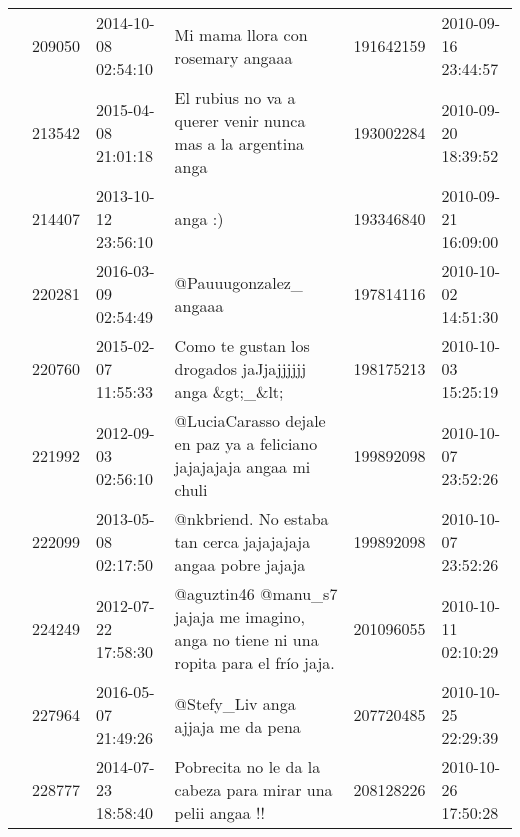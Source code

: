\begin{tabular}{llllrl}
           & 209050  & 2014-10-08 02:54:10 &                                                                                                            Mi mama llora con rosemary angaaa &   191642159 & 2010-09-16 23:44:57 \\
           & 213542  & 2015-04-08 21:01:18 &                                                                                 El rubius no va a querer venir nunca mas a la argentina anga &   193002284 & 2010-09-20 18:39:52 \\
           & 214407  & 2013-10-12 23:56:10 &                                                                                                                                      anga :) &   193346840 & 2010-09-21 16:09:00 \\
           & 220281  & 2016-03-09 02:54:49 &                                                                                                                       @Pauuugonzalez\_ angaaa &   197814116 & 2010-10-02 14:51:30 \\
           & 220760  & 2015-02-07 11:55:33 &                                                                                       Como te gustan los drogados jaJjajjjjjj anga \&gt;\_\&lt; &   198175213 & 2010-10-03 15:25:19 \\
           & 221992  & 2012-09-03 02:56:10 &                                                                         @LuciaCarasso dejale en paz ya a feliciano jajajajaja angaa mi chuli &   199892098 & 2010-10-07 23:52:26 \\
           & 222099  & 2013-05-08 02:17:50 &                                                                                 @nkbriend. No estaba tan cerca jajajajaja angaa pobre jajaja &   199892098 & 2010-10-07 23:52:26 \\
           & 224249  & 2012-07-22 17:58:30 &                                                        @aguztin46 @manu\_s7 jajaja me imagino, anga no tiene ni una ropita para el frío jaja. &   201096055 & 2010-10-11 02:10:29 \\
           & 227964  & 2016-05-07 21:49:26 &                                                                                                            @Stefy\_Liv anga ajjaja me da pena &   207720485 & 2010-10-25 22:29:39 \\
           & 228777  & 2014-07-23 18:58:40 &                                                                                   Pobrecita no le da la cabeza para mirar una pelii angaa !! &   208128226 & 2010-10-26 17:50:28 \\

\end{tabular}
